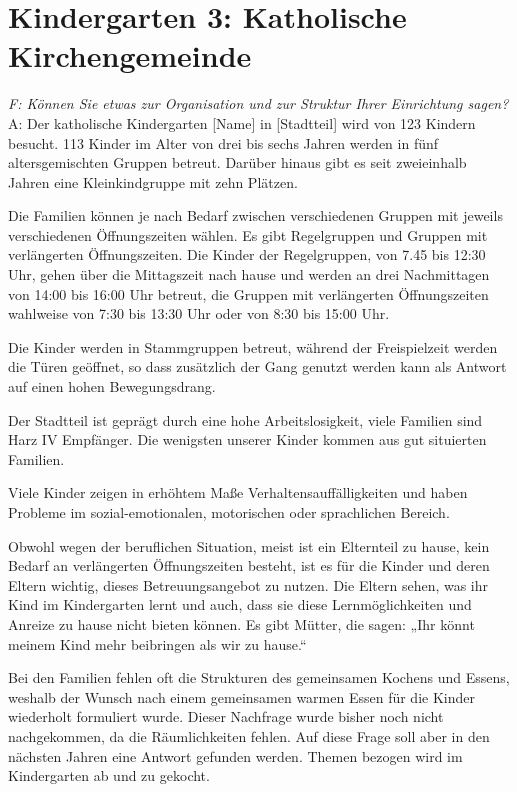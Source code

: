 \section{Kindergarten 3: Katholische Kirchengemeinde}
\begin{linenumbers*}
\emph{F: Können Sie etwas zur Organisation und zur Struktur Ihrer Einrichtung sagen?}
A: Der katholische Kindergarten {[Name]} in {[Stadtteil]} wird von 123 Kindern besucht. 113 Kinder im Alter von drei bis sechs Jahren werden in fünf altersgemischten Gruppen betreut.
Darüber hinaus gibt es seit zweieinhalb Jahren eine Kleinkindgruppe mit zehn Plätzen.
 
Die Familien können je nach Bedarf zwischen verschiedenen Gruppen mit jeweils verschiedenen Öffnungszeiten wählen. Es gibt Regelgruppen und Gruppen mit verlängerten Öffnungszeiten. Die Kinder der Regelgruppen, von 7.45 bis 12:30 Uhr, gehen über die Mittagszeit nach hause und werden an drei Nachmittagen von 14:00 bis 16:00 Uhr betreut, die Gruppen mit verlängerten Öffnungszeiten wahlweise von 7:30 bis 13:30 Uhr oder von 8:30 bis 15:00 Uhr.  

Die Kinder werden in Stammgruppen betreut, während der Freispielzeit werden die Türen geöffnet, so dass zusätzlich der Gang genutzt werden kann als Antwort auf einen hohen Bewegungsdrang. 

Der Stadtteil ist geprägt durch eine hohe Arbeitslosigkeit, viele Familien sind Harz IV Empfänger. Die wenigsten unserer Kinder kommen aus gut situierten Familien. 

Viele Kinder zeigen in erhöhtem Maße Verhaltensauffälligkeiten und haben Probleme im sozial-emotionalen, motorischen oder sprachlichen Bereich. 

Obwohl wegen der beruflichen Situation, meist ist ein Elternteil zu hause, kein Bedarf an verlängerten Öffnungszeiten besteht, 
ist es für die Kinder und deren Eltern wichtig, dieses Betreuungsangebot zu nutzen. Die Eltern sehen, was ihr Kind im Kindergarten lernt und auch, dass sie diese Lernmöglichkeiten und Anreize zu hause nicht bieten können.
Es gibt Mütter, die sagen: „Ihr könnt meinem Kind mehr beibringen als wir zu hause.“ 
 
Bei den Familien fehlen oft die Strukturen des gemeinsamen Kochens und Essens, weshalb der Wunsch nach einem gemeinsamen warmen Essen für die Kinder wiederholt formuliert wurde. Dieser Nachfrage wurde bisher noch nicht nachgekommen, da die Räumlichkeiten fehlen. Auf diese Frage soll aber in den nächsten Jahren eine Antwort gefunden werden. Themen bezogen wird im Kindergarten ab und zu gekocht.  


\end{linenumbers*}
